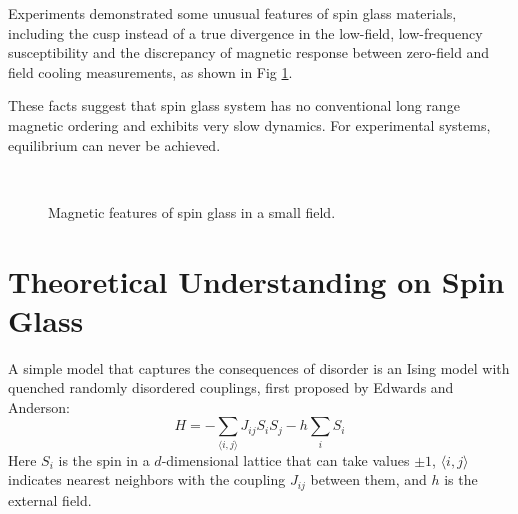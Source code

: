 Experiments demonstrated some unusual features of spin glass materials, 
including the cusp instead of a true divergence in the low-field, low-frequency 
susceptibility and the discrepancy of magnetic response between zero-field and field cooling 
measurements, as shown in Fig \ref{fig:experimentsSG}. 

These facts suggest that spin glass system has no conventional 
long range magnetic ordering and exhibits very slow dynamics. For experimental 
systems, equilibrium can never be achieved. 

\begin{figure}[!h]
  \label{fig:experimentsSG}
  \centering
  \\  
  \caption{Magnetic features of spin glass in a small field.}
\end{figure}

\section{Theoretical Understanding on Spin Glass}
A simple model that captures the consequences of disorder is an Ising model 
with quenched randomly disordered couplings, first proposed by Edwards and 
Anderson\cite{Edwards-Anderson1975}:
\begin{equation}
  \label{eq:Edwards-Anderson}
  H=-\sum_{\langle i,j \rangle}J_{ij}S_iS_j-h\sum_iS_i
\end{equation}
Here $S_i$ is the spin in a $d$-dimensional lattice that can take values $\pm 1$,
$\langle i,j \rangle$ indicates nearest neighbors with the coupling $J_{ij}$ between 
them, and $h$ is the external field.
 
